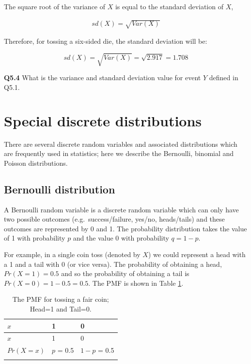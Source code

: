 \documentclass[
  oneside]{krantz}
\begin{document}
The square root of the variance of \(X\) is equal to the standard deviation of \(X\),

\begin{align}
sd(X) = \sqrt {Var(X)}
\end{align}

Therefore, for tossing a six-sided die, the standard deviation will be:

\[sd(X) = \sqrt{Var(X)} = \sqrt{2.917} = 1.708\]

\textbf{Q5.4} What is the variance and standard deviation value for event \(Y\) defined in Q5.1.

\hypertarget{special-discrete-distributions}{%
\section{Special discrete distributions}\label{special-discrete-distributions}}

There are several discrete random variables and associated distributions which are frequently used in statistics; here we describe the Bernoulli, binomial and Poisson distributions.

\hypertarget{bernoulli-distribution}{%
\subsection{Bernoulli distribution}\label{bernoulli-distribution}}

A Bernoulli random variable is a discrete random variable which can only have two possible outcomes (e.g.~success/failure, yes/no, heads/tails) and these outcomes are represented by 0 and 1. The probability distribution takes the value of 1 with probability \(p\) and the value \(0\) with probability \(q=1-p\).

For example, in a single coin toss (denoted by \(X\)) we could represent a head with a 1 and a tail with 0 (or vice versa). The probability of obtaining a head, \(Pr(X=1) = 0.5\) and so the probability of obtaining a tail is \(Pr(X=0) = 1 - 0.5=0.5\). The PMF is shown in Table \ref{tab:pmffaircoin}.

\begin{longtable}[]{@{}lll@{}}
\caption{\label{tab:pmffaircoin} The PMF for tossing a fair coin; Head=1 and Tail=0.}\tabularnewline
\toprule
\(x\) & 1 & 0\tabularnewline
\midrule
\endfirsthead
\toprule
\(x\) & 1 & 0\tabularnewline
\midrule
\endhead
\(Pr(X=x)\) & \(p\) = 0.5 & \(1-p\) = 0.5\tabularnewline
& &\tabularnewline
\bottomrule
\end{longtable}
\end{document}
